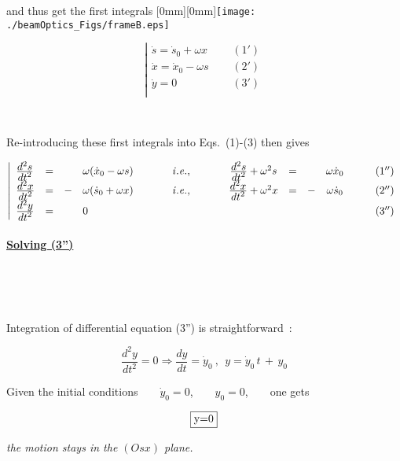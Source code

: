 \documentclass[12pt]{paper}
\newcommand{\nin}{\noindent}
\newcommand{\blue}{\color{blue}}
\begin{document}
and thus get the first integrals
   \hfill \raisebox{-30mm}[0mm][0mm]{\texttt{[image: ./beamOptics\_Figs/frameB.eps]}}



$$\left| 
\begin{array}{lcrccl} 
\dot s = \dot s_0 + \omega x  & ~ ~ ~ ~ ~ ~   (1') \\
\dot x = \dot x_0 - \omega s  & ~ ~ ~ ~ ~ ~   (2') \\
\dot y =0                      & ~ ~ ~ ~ ~ ~   (3') \\
\end{array} 
\right.$$

~

\nin Re-introducing these first integrals into Eqs.~(1)-(3) then gives 


$$\left| 
\begin{array}{lcclrcccrccr} 
\frac{\textstyle{d^2s}}{\textstyle{dt^2}} &=&  & \omega (\dot x_0 -\omega s)  & ~ ~ ~ ~ ~ & \it i.e., & ~ ~ ~ ~ ~ &  \frac{\textstyle{d^2s}}{\textstyle{dt^2}} + \omega^2 s &=&  & \omega \dot x_0 & ~ ~ ~ ~ ~ ~   (1'')\\
\frac{\textstyle{d^2x}}{\textstyle{dt^2}} &=& -& \omega (\dot s_0 + \omega x) && \it i.e., &  & \frac{\textstyle{d^2x}}{\textstyle{dt^2}}  +  \omega^2 x &=& -& \omega \dot s_0  &  (2'')\\
\frac{\textstyle{d^2y}}{\textstyle{dt^2}} &=&  &  0                           &&           &  &                                                          & &  &   &  (3'') \\
\end{array} 
\right.$$





\clearpage 


\paragraph{\underline{Solving (3'')}} ~ ~ ~ 

~

Integration of differential equation (3'') is straightforward~: 


$$\frac{\textstyle{d^2y}}{\textstyle{dt^2}} = 0 \Rightarrow \frac{\textstyle{dy}}{\textstyle{dt}}  =  \dot y_0  ~ , ~ ~  y =  \dot y_0 \, t \, + \, y_0  $$

Given the initial conditions ~ ~  $\dot y_0 = 0$, ~ ~  $y_0 = 0 $, ~ ~ one gets 

{\blue 
$$ \fbox{y=0} $$ 


\nin \textsl{the motion stays in the $(Osx)$ plane. }
}
\end{document}
